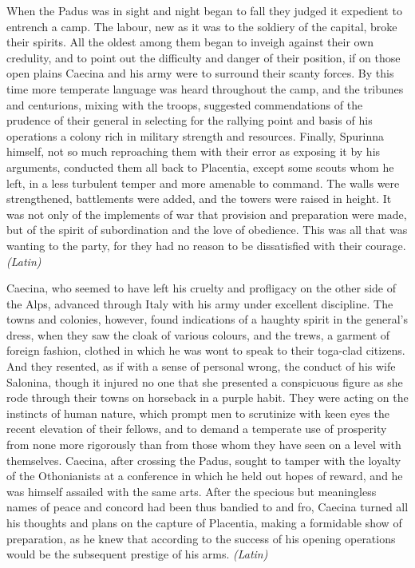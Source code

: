 When the Padus was in sight and night began to fall they judged it expedient to entrench a camp. The labour, new as it was to the soldiery of the capital, broke their spirits. All the oldest among them began to inveigh against their own credulity, and to point out the difficulty and danger of their position, if on those open plains Caecina and his army were to surround their scanty forces. By this time more temperate language was heard throughout the camp, and the tribunes and centurions, mixing with the troops, suggested commendations of the prudence of their general in selecting for the rallying point and basis of his operations a colony rich in military strength and resources. Finally, Spurinna himself, not so much reproaching them with their error as exposing it by his arguments, conducted them all back to Placentia, except some scouts whom he left, in a less turbulent temper and more amenable to command. The walls were strengthened, battlements were added, and the towers were raised in height. It was not only of the implements of war that provision and preparation were made, but of the spirit of subordination and the love of obedience. This was all that was wanting to the party, for they had no reason to be dissatisfied with their courage. \emph{(Latin)}


Caecina, who seemed to have left his cruelty and profligacy on the other side of the Alps, advanced through Italy with his army under excellent discipline. The towns and colonies, however, found indications of a haughty spirit in the general's dress, when they saw the cloak of various colours, and the trews, a garment of foreign fashion, clothed in which he was wont to speak to their toga-clad citizens. And they resented, as if with a sense of personal wrong, the conduct of his wife Salonina, though it injured no one that she presented a conspicuous figure as she rode through their towns on horseback in a purple habit. They were acting on the instincts of human nature, which prompt men to scrutinize with keen eyes the recent elevation of their fellows, and to demand a temperate use of prosperity from none more rigorously than from those whom they have seen on a level with themselves. Caecina, after crossing the Padus, sought to tamper with the loyalty of the Othonianists at a conference in which he held out hopes of reward, and he was himself assailed with the same arts. After the specious but meaningless names of peace and concord had been thus bandied to and fro, Caecina turned all his thoughts and plans on the capture of Placentia, making a formidable show of preparation, as he knew that according to the success of his opening operations would be the subsequent prestige of his arms. \emph{(Latin)}

